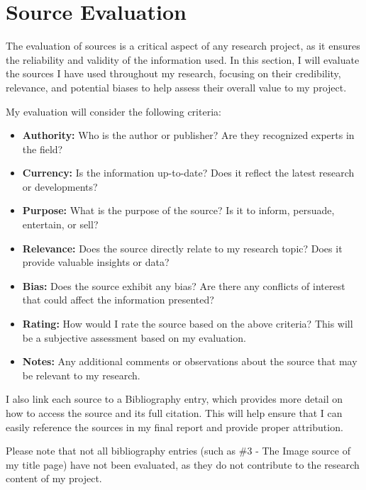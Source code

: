\section{Source Evaluation}
The evaluation of sources is a critical aspect of any research project, as it ensures the reliability and validity of the information used. In this section, I will evaluate the sources I have used throughout my research, focusing on their credibility, relevance, and potential biases to help assess their overall value to my project.

My evaluation will consider the following criteria:
\begin{itemize}
    \item \textbf{Authority:} Who is the author or publisher? Are they recognized experts in the field?
    \item \textbf{Currency:} Is the information up-to-date? Does it reflect the latest research or developments?
    \item \textbf{Purpose:} What is the purpose of the source? Is it to inform, persuade, entertain, or sell?
    \item \textbf{Relevance:} Does the source directly relate to my research topic? Does it provide valuable insights or data?
    \item \textbf{Bias:} Does the source exhibit any bias? Are there any conflicts of interest that could affect the information presented?
    \item \textbf{Rating:} How would I rate the source based on the above criteria? This will be a subjective assessment based on my evaluation.
    \item \textbf{Notes:} Any additional comments or observations about the source that may be relevant to my research.
\end{itemize}

I also link each source to a Bibliography entry, which provides more detail on how to access the source and its full citation. This will help ensure that I can easily reference the sources in my final report and provide proper attribution.

Please note that not all bibliography entries (such as \#3 - The Image source of my title page) have not been evaluated, as they do not contribute to the research content of my project.

